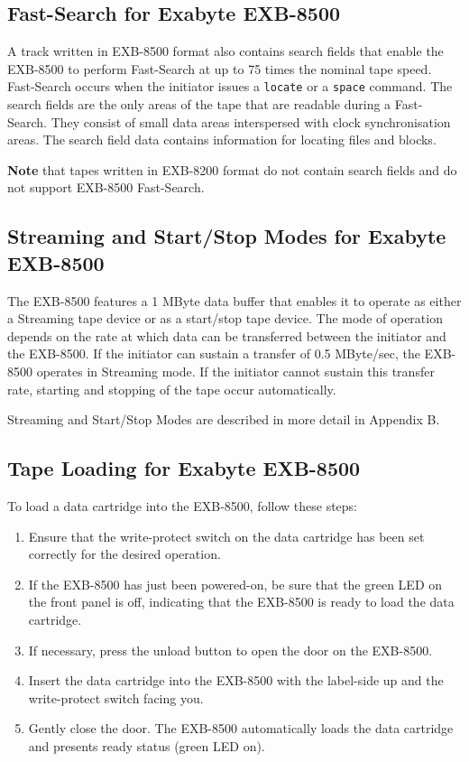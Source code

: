 \documentclass[11pt]{article}
\begin{document}
\subsection {Fast-Search for Exabyte EXB-8500}

A track written in EXB-8500 format also contains search fields that enable
the EXB-8500 to perform Fast-Search at up to 75 times the nominal tape speed.
Fast-Search occurs when the initiator issues a {\tt locate} or a {\tt space}
command. The search fields are the only areas of the tape that are readable
during a Fast-Search. They consist of small data areas interspersed with clock
synchronisation areas. The search field data contains information for
locating files and blocks.

{\bf Note} that tapes written in EXB-8200 format do not contain search fields
and do not support EXB-8500 Fast-Search.

\subsection {Streaming and Start/Stop Modes for Exabyte EXB-8500}

The EXB-8500 features a 1 MByte data buffer that enables it to operate as
either a Streaming tape device or as a start/stop tape device. The mode of
operation depends on the rate at which data can be transferred between the
initiator and the EXB-8500. If the initiator can sustain a transfer of 0.5
MByte/sec, the EXB-8500 operates in Streaming mode. If the initiator cannot
sustain this transfer rate, starting and stopping of the tape occur
automatically.

Streaming and Start/Stop Modes are described in more detail in Appendix B.

\subsection {Tape Loading for Exabyte EXB-8500}

To load a data cartridge into the EXB-8500, follow these steps:

\begin {enumerate}

\item Ensure that the write-protect switch on the data cartridge has been
set correctly for the desired operation.

\item If the EXB-8500 has just been powered-on, be sure that the green LED
on the front panel is off, indicating that the EXB-8500 is ready to load the
data cartridge.

\item If necessary, press the unload button to open the door on the EXB-8500.

\item Insert the data cartridge into the EXB-8500 with the label-side up and
the write-protect switch facing you.

\item Gently close the door. The EXB-8500 automatically loads the data
cartridge and presents ready status (green LED on).

\end {enumerate}
\end{document}
